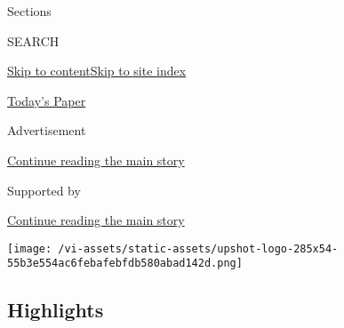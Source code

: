 Sections

SEARCH

\protect\hyperlink{site-content}{Skip to
content}\protect\hyperlink{site-index}{Skip to site index}

\href{https://myaccount.nytimes3xbfgragh.onion/auth/login?response_type=cookie\&client_id=vi}{}

\href{https://www.nytimes3xbfgragh.onion/section/todayspaper}{Today's
Paper}

Advertisement

\protect\hyperlink{after-top}{Continue reading the main story}

Supported by

\protect\hyperlink{after-sponsor}{Continue reading the main story}

\texttt{[image: /vi-assets/static-assets/upshot-logo-285x54-55b3e554ac6febafebfdb580abad142d.png]}

\hypertarget{highlights}{%
\subsection{Highlights}\label{highlights}}


